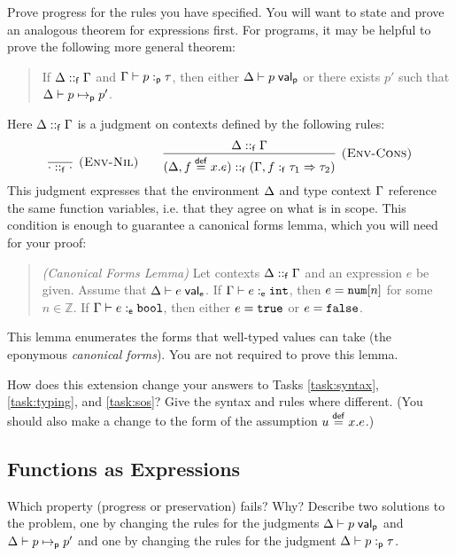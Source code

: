 \documentclass{article}
\begin{document}
\begin{task}
  Prove progress for the rules you have specified. You will want to
  state and prove an analogous theorem for expressions first. For
  programs, it may be helpful to prove the following more general
  theorem:
  \begin{quote}
    If $\Delta ::_{\mathsf{f}} \Gamma$ and $\Gamma \vdash p :_{\mathsf{p}} \tau$, then either $\Delta
    \vdash p\; \mathsf{val}_{\mathsf{p}}$ or there exists $p'$ such that
    $\Delta \vdash p \mapsto_{\mathsf{p}} p'$. \\
  \end{quote}
  Here $\Delta ::_{\mathsf{f}} \Gamma$ is a judgment on contexts defined by the
  following rules:
  \[
  \infer[\rulename{Env-Nil}]
    {\fctx{\cdot}{\cdot}}
    {}
  \qquad
  \infer[\rulename{Env-Cons}]
    {\fctx{(\D, \fundef{f}{x}{e})}{(\G, \ftype{f}{\tau_1}{\tau_2})}}
    {\fctx{\D}{\G}}
  \]
  This judgment expresses that the environment $\Delta$ and type context
  $\Gamma$ reference the same function variables, i.e. that they agree on
  what is in scope. This condition is enough to guarantee a canonical
  forms lemma, which you will need for your proof:
  \begin{quote}
    \emph{(Canonical Forms Lemma)} Let contexts $\Delta ::_{\mathsf{f}} \Gamma$ and an
    expression $e$ be given. Assume that $\Delta \vdash e\; \mathsf{val}_{\mathsf{e}}$. If
    $\Gamma \vdash e :_{\mathsf{e}} \mathtt{int}$, then $e = \mathtt{num}[n]$ for some $n \in
    \mathbb{Z}$. If $\Gamma \vdash e :_{\mathsf{e}} \mathtt{bool}$, then either $e =
    \mathtt{true}$ or $e = \mathtt{false}$.
  \end{quote}
  This lemma enumerates the forms that well-typed values can take (the
  eponymous \emph{canonical forms}). You are not required to prove
  this lemma.
\end{task}
\begin{sol}
\end{sol}

\begin{task} \label{task:recursive}
  How does this extension change your answers to Tasks
  \ref{task:syntax}, \ref{task:typing}, and \ref{task:sos}? Give the
  syntax and rules where different. (You should also make a change to
  the form of the assumption $u \overset{\mathsf{def}}{=} x.e$.)
\end{task}
\begin{sol}
\end{sol}

\subsection{Functions as Expressions}
\begin{task} \label{task:fix}
  Which property (progress or preservation) fails? Why? Describe two
  solutions to the problem, one by changing the rules for the
  judgments $\Delta \vdash p\; \mathsf{val}_{\mathsf{p}}$ and $\Delta \vdash p \mapsto_{\mathsf{p}} p'$ and
  one by changing the rules for the judgment $\Delta \vdash p :_{\mathsf{p}} \tau$.
\end{task}
\begin{sol}
\end{sol}
\end{document}
